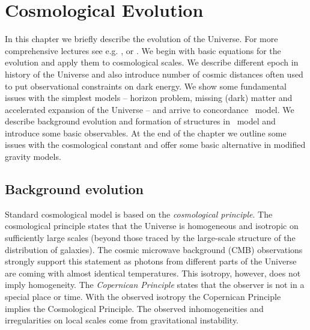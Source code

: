 \chapter{Cosmological Evolution}
In this chapter we briefly describe the evolution of the Universe. For more comprehensive lectures see e.g. \cite{Ref:Weinberg}, \cite{2002col.luc..cosmology} or \cite{2010deto.book.....A}. We begin with basic equations for the evolution and apply them to cosmological scales. We describe different epoch in history of the Universe and also introduce number of cosmic distances often used to put observational constraints on dark energy. We show some fundamental issues with the simplest models -- horizon problem, missing (dark) matter and accelerated expansion of the Universe -- and arrive to concordance \LCDM\ model. We describe background evolution and formation of structures in \LCDM\ model and introduce some basic observables. At the end of the chapter we outline some issues with the cosmological constant and offer some basic alternative in modified gravity models.

\section{Background evolution}
Standard cosmological model is based on the \textit{cosmological principle}. The cosmological principle states that the Universe is homogeneous and isotropic on sufficiently large scales (beyond those traced by the large-scale structure of the distribution of galaxies). The cosmic microwave background (CMB) observations strongly support this statement as photons from different parts of the Universe are coming with almost identical temperatures. This isotropy, however, does not imply homogeneity. The \textit{Copernican Principle} states that the observer is not in a special place or time. With the observed isotropy the Copernican Principle implies the Cosmological Principle. The observed inhomogeneities and irregularities on local scales come from gravitational instability.
